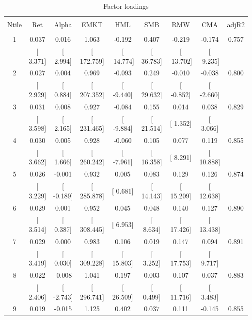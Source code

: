 \documentclass[16pt]{article}
\begin{document}
\begin{table}[!htbp] \centering 
  \caption{Factor loadings} 
  \label{} 
\begin{tabular}{@{\extracolsep{-3pt}} ccccccccc} 
\\[-1.8ex]\hline 
\hline \\[-1.8ex] 
Ntile & Ret & Alpha & EMKT & HML & SMB & RMW & CMA & adjR2 \\ 
\hline \\[-1.8ex] 
1 & 0.037 & 0.016 & 1.063 & -0.192 & 0.407 & -0.219 & -0.174 & 0.757 \\ 
 & [ 3.371] & [ 2.994] & [ 172.759] & [ -14.774] & [ 36.783] & [ -13.702] & [ -9.235] &  \\ 
2 & 0.027 & 0.004 & 0.969 & -0.093 & 0.249 & -0.010 & -0.038 & 0.800 \\ 
 & [ 2.929] & [ 0.884] & [ 207.352] & [ -9.440] & [ 29.632] & [ -0.852] & [ -2.660] &  \\ 
3 & 0.031 & 0.008 & 0.927 & -0.084 & 0.155 & 0.014 & 0.038 & 0.829 \\ 
 & [ 3.598] & [ 2.165] & [ 231.465] & [ -9.884] & [ 21.514] & [ 1.352] & [ 3.066] &  \\ 
4 & 0.030 & 0.005 & 0.928 & -0.060 & 0.105 & 0.077 & 0.119 & 0.855 \\ 
 & [ 3.662] & [ 1.666] & [ 260.242] & [ -7.961] & [ 16.358] & [ 8.291] & [ 10.888] &  \\ 
5 & 0.026 & -0.001 & 0.932 & 0.005 & 0.083 & 0.129 & 0.126 & 0.874 \\ 
 & [ 3.229] & [ -0.189] & [ 285.878] & [ 0.681] & [ 14.143] & [ 15.209] & [ 12.638] &  \\ 
6 & 0.029 & 0.001 & 0.952 & 0.045 & 0.048 & 0.140 & 0.127 & 0.890 \\ 
 & [ 3.514] & [ 0.387] & [ 308.445] & [ 6.953] & [ 8.634] & [ 17.426] & [ 13.438] &  \\ 
7 & 0.029 & 0.000 & 0.983 & 0.106 & 0.019 & 0.147 & 0.094 & 0.891 \\ 
 & [ 3.419] & [ 0.030] & [ 309.228] & [ 15.803] & [ 3.252] & [ 17.753] & [ 9.717] &  \\ 
8 & 0.022 & -0.008 & 1.041 & 0.197 & 0.003 & 0.107 & 0.037 & 0.883 \\ 
 & [ 2.406] & [ -2.743] & [ 296.741] & [ 26.509] & [ 0.499] & [ 11.716] & [ 3.483] &  \\ 
9 & 0.019 & -0.015 & 1.125 & 0.402 & 0.037 & 0.111 & -0.145 & 0.855 \\ 

\end{tabular}
\end{table}
\end{document}
